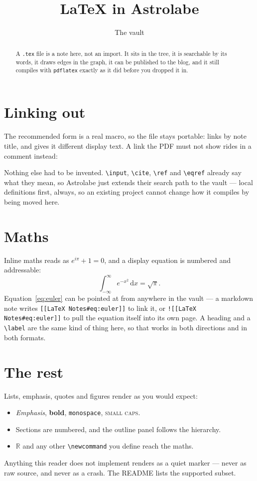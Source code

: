 \documentclass{article}
\title{LaTeX in Astrolabe}
\author{The vault}
\newcommand{\R}{\mathbb{R}}
\begin{document}
\maketitle

\begin{abstract}
  A \texttt{.tex} file is a note here, not an import. It sits in the tree, it
  is searchable by its words, it draws edges in the graph, it can be published
  to the blog, and it still compiles with \texttt{pdflatex} exactly as it did
  before you dropped it in.
\end{abstract}

\section{Linking out}\label{sec:linking}
The recommended form is a real macro, so the file stays portable:
 links by note title, and
 gives it different display text. A link the
PDF must not show rides in a comment instead:

Nothing else had to be invented. \texttt{\textbackslash input}, \texttt{\textbackslash cite},
\texttt{\textbackslash ref} and \texttt{\textbackslash eqref} already say what they mean, so Astrolabe
just extends their search path to the vault --- local definitions first, always,
so an existing project cannot change how it compiles by being moved here.

\section{Maths}\label{sec:maths}
Inline maths reads as $e^{i\pi} + 1 = 0$, and a display equation is numbered
and addressable:
\begin{equation}\label{eq:euler}
  \int_{-\infty}^{\infty} e^{-x^{2}}\,\mathrm{d}x = \sqrt{\pi}.
\end{equation}
Equation~\eqref{eq:euler} can be pointed at from anywhere in the vault --- a
markdown note writes \texttt{[[LaTeX Notes\#eq:euler]]} to link it, or
\texttt{![[LaTeX Notes\#eq:euler]]} to pull the equation itself into its own
page. A heading and a \texttt{\textbackslash label} are the same kind of thing here, so that
works in both directions and in both formats.

\section{The rest}\label{sec:rest}
Lists, emphasis, quotes and figures render as you would expect:
\begin{itemize}
  \item \emph{Emphasis}, \textbf{bold}, \texttt{monospace}, \textsc{small caps}.
  \item Sections are numbered, and the outline panel follows the hierarchy.
  \item $\R$ and any other \texttt{\textbackslash newcommand} you define reach the maths.
\end{itemize}

\begin{theorem}\label{thm:honest}
  Anything this reader does not implement renders as a quiet marker --- never
  as raw source, and never as a crash. The README lists the supported subset.
\end{theorem}
\end{document}
